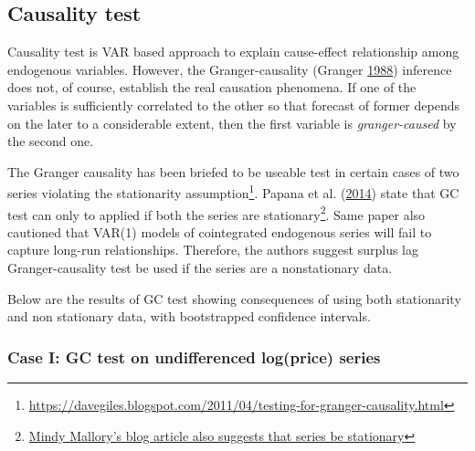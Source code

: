 \documentclass[
  12pt,
]{article}
\begin{document}
\hypertarget{causality-test}{%
\subsection{Causality test}\label{causality-test}}

Causality test is VAR based approach to explain cause-effect relationship among endogenous variables. However, the Granger-causality (Granger \protect\hyperlink{ref-granger1988causality}{1988}) inference does not, of course, establish the real causation phenomena. If one of the variables is sufficiently correlated to the other so that forecast of former depends on the later to a considerable extent, then the first variable is \emph{granger-caused} by the second one.

The Granger causality has been briefed to be useable test in certain cases of two series violating the stationarity assumption\footnote{\url{https://davegiles.blogspot.com/2011/04/testing-for-granger-causality.html}}. Papana et al. (\protect\hyperlink{ref-papana2014identifying}{2014}) state that GC test can only to applied if both the series are stationary\footnote{\href{http://blog.mindymallory.com/2018/02/basic-time-series-analysis-the-var-model-explained/}{Mindy Mallory's blog article also suggests that series be stationary}}. Same paper also cautioned that VAR(1) models of cointegrated endogenous series will fail to capture long-run relationships. Therefore, the authors suggest surplus lag Granger-causality test be used if the series are a nonstationary data.

Below are the results of GC test showing consequences of using both stationarity and non stationary data, with bootstrapped confidence intervals.

\hypertarget{case-i-gc-test-on-undifferenced-logprice-series}{%
\subsubsection{Case I: GC test on undifferenced log(price) series}\label{case-i-gc-test-on-undifferenced-logprice-series}}
\end{document}
